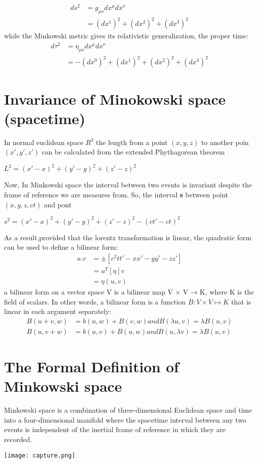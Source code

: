 \documentclass[11]{article}
\begin{document}
\begin{align*} 
ds^2&=g_{\mu \nu}d x^{\mu} d x^{\nu}\\
&=(dx^1)^2+(dx^2)^2+(dx^3)^2
\end{align*}
while the Minkowski metric gives its relativistic generalization, the proper time:\\
\begin{align*}
d\tau^2&=\eta_{\mu \nu} d x^\mu d x^\nu\\
&=-(dx^0)^2+(dx^1)^2+(dx^2)^2+(dx^3)^2
\end{align*}

\section{Invariance of Minokowski space (spacetime)}
In normal euclidean space $R^3$ the length from a point $(x,y,z)$ to another poin $(x',y',z')$ can be calculated from the extended Phythagorean theorem \\
\begin{center} $L^2=(x'-x)^2+(y'-y)^2+(z'-z)^2$
\end{center}
Now, In Minkowski space the interval between two events is invariant despite the frame of reference we are measures from.
So, the interval \textbf{s} between point $(x,y,z,ct)$ and pont %
\begin{center}
$s^2=(x'-x)^2+(y'-y)^2+(z'-z)^2-(ct'-ct)^2$
\end{center}
As a result,provided that the lorentz transformation is linear, the quadratic form can be used to define a bilinear form:
\begin{align*}
u.v&= \pm[c^2tt'-xx'-yy'-zz']\\
&=u^T[\eta]v\\
&=\eta(u,v)
\end{align*}
a bilinear form on a vector space V is a bilinear map V × V → K, where K is the field of scalars. In other words, a bilinear form is a function $B : V \times V \mapsto K$ that is linear in each argument separately:\\
\begin{align*}
B(u+v,w)&=b(u,w)+B(v,w) and B(\lambda u,v)=\lambda B(u,v)\\
B(u,v+w)&=b(u,v)+B(u,w) and B(u,\lambda v)=\lambda B(u,v)
\end{align*}

\section{The Formal Definition of Minkowski space}
Minkowski space is a combination of three-dimensional Euclidean space and time into a four-dimensional manifold where the spacetime interval between any two events is independent of the inertial frame of reference in which they are recorded.
\begin{center}
\texttt{[image: capture.png]}
\end{center}
\end{document}

